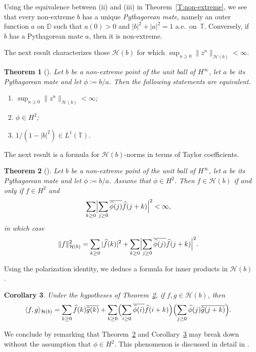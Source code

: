 \documentclass[11pt,reqno]{amsart}
\theoremstyle{plain}
\newtheorem{theorem}{Theorem}[section]
\newtheorem{corollary}[theorem]{Corollary}
\theoremstyle{definition}
\theoremstyle{remark}
\newcommand{\cH}{\mathcal{H}}
\newcommand{\DD}{\mathbb{D}}
\newcommand{\TT}{\mathbb{T}}
\renewcommand{\hat}{\widehat}
\begin{document}
Using the equivalence between (ii) and (iii) in Theorem~\ref{T:non-extreme},
we see that every non-extreme $b$ has a unique \emph{Pythagorean mate},
namely an outer function $a$ on $\DD$ such that $a(0)>0$
and $|b|^2+|a|^2=1$ a.e.\ on~$\TT$. 
Conversely, if $b$ has a Pythagorean mate $a$,
then it is non-extreme.

The next result characterizes those $\cH(b)$ for which $\sup_{n\ge0}\|z^n\|_{\cH(b)}<\infty$.

\begin{theorem}[]\label{T:tame}
Let $b$ be a non-extreme point of the unit ball of $H^\infty$, let $a$ be its Pythagorean mate
and let $\phi:=b/a$. Then the following statements are equivalent.
\begin{enumerate}[\normalfont\rm(i)]
\item $\sup_{n\ge0}\|z^n\|_{\cH(b)}<\infty$;
\item $\phi\in H^2$;
\item $1/(1-|b|^2)\in L^1(\TT)$.
\end{enumerate}
\end{theorem}

The next result is a formula for  $\cH(b)$-norms in terms of Taylor coefficients.

\begin{theorem}[]\label{T:formula}
Let $b$ be a non-extreme point of the unit ball of $H^\infty$, let $a$ be its Pythagorean mate
and let $\phi:=b/a$. Assume that $\phi\in H^2$.
Then $f\in\cH(b)$ if and only if $f\in H^2$ and
\[
\sum_{k\ge0}\Bigl|\sum_{j\ge0}\overline{\hat{\phi}(j)}\hat{f}(j+k)\Bigr|^2<\infty,
\]
in which case
\[
\|f\|_{\cH(b)}^2=\sum_{k\ge0}|\hat{f}(k)|^2
+\sum_{k\ge0}\Bigl|\sum_{j\ge0}\overline{\hat{\phi}(j)}\hat{f}(j+k)\Bigr|^2.
\]
\end{theorem}


Using the polarization identity, we deduce a formula for inner products in $\cH(b)$.

\begin{corollary}\label{C:formula}
Under the hypotheses of Theorem~\ref{T:formula},
if $f,g\in\cH(b)$, then
\[
\langle f,g\rangle_{\cH(b)}=\sum_{k\ge0}\hat{f}(k)\overline{\hat{g}(k)}
+\sum_{k\ge0}\Bigl(\sum_{i\ge0}\overline{\hat{\phi}(i)}\hat{f}(i+k)\Bigr)\Bigl(\sum_{j\ge0}{\hat{\phi}(j)}\overline{\hat{g}(j+k)}\Bigr).
\]
\end{corollary}

We conclude by remarking that Theorem~\ref{T:formula} and Corollary~\ref{C:formula} may break down without the assumption that $\phi\in H^2$.
This phenomenon is discussed in detail in \cite{Ra26}.
\end{document}
